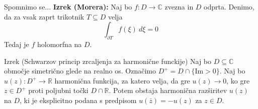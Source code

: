 \documentclass{beamer}
\theoremstyle{definition}
\theoremstyle{definition}
\begin{document}
\begin{frame}
   \begin{alertblock}{Spomnimo se...}
      \textbf{Izrek (Morera):} \newline
      Naj bo $f: D \to \mathbb{C}$ zvezna in $D$ odprta. 
      Denimo, da za vsak zaprt trikotnik $T \subseteq D$ velja 
      $$
      \int_{\partial T} {f(\xi)~d\xi} = 0
      $$
      Tedaj je $f$ holomorfna na $D$.
   \end{alertblock}
\end{frame}

\begin{frame}
   \begin{exampleblock}{Izrek (Schwarzov princip zrcaljenja za harmonične funckije)}
      Naj bo $D \subseteq \mathbb{C}$ območje simetrično glede na realno os. 
      Označimo $D^{+} = D \cap \{\text{Im} > 0\}$. 
      Naj bo $u(z): D^{+} \to \mathbb{R}$ harmonična funkcija, za katero velja, da gre $u(z) \to 0$, ko gre $z \in D^{+}$ proti poljubni točki $D \cap \mathbb{R}$. 
      \newline
      Potem obstaja harmonična razširitev $u(z)$ na $D$, ki je eksplicitno podana s predpisom $u(\bar{z}) = - u(z)$ za $z \in D$.
   \end{exampleblock}
   \pause
\end{frame}

\end{document}
